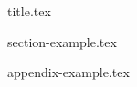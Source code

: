 \documentclass{book}
\begin{document}
\thispagestyle{empty}

{title.tex}

{\hypersetup{linkcolor=black}\tableofcontents}

\setcounter{page}{1}
{section-example.tex}

\begin{appendices}
{appendix-example.tex}
\end{appendices}
\end{document}
